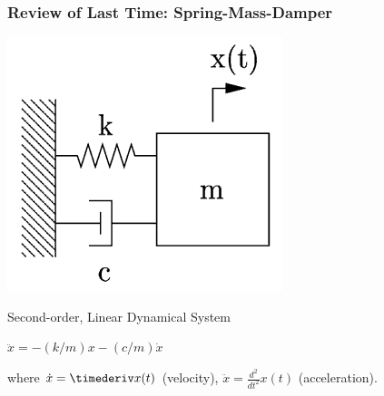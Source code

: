 \documentclass[12pt]{beamer}
\begin{document}
\begin{frame}
\frametitle{Review of Last Time: Spring-Mass-Damper}

\begin{center}
\includegraphics[width=.3\linewidth]{pic/spring-mass-damper.png}
\end{center}

\begin{block}{Second-order, Linear Dynamical System}
\begin{itemize}
\vitem
$\ddot x = -(k/m) x - (c/m) \dot x$
	
\vitem
where $\dot x = \timederiv x(t)$ (velocity), $\ddot x = \frac{d^2}{dt^2} x(t)$ (acceleration).
\end{itemize}
\end{block}

\end{frame}
\end{document}

